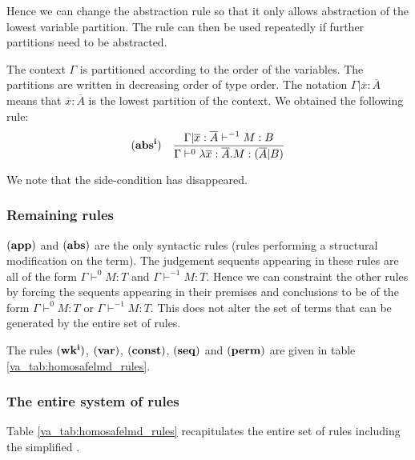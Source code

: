 Hence we can change the abstraction rule so that it only allows
abstraction of the lowest variable partition. The rule can then be
used repeatedly if further partitions need to be abstracted.

The context $\Gamma$ is partitioned according to the order of the
variables. The partitions are written in decreasing order of type
order. The notation $\Gamma | \overline{x}:\overline{A}$ means that
$\overline{x}:\overline{A}$ is the lowest partition of the context.
We obtained the following rule:
$$ \mathbf{(abs^i)} \quad  \frac{\displaystyle \Gamma| \overline{x} : \overline{A} \vdash^{-1} M : B}{\Gamma  \vdash^{0} \lambda \overline{x} : \overline{A} . M : (\overline{A}|B)}$$

We note that the side-condition has disappeared.

\subsubsection{Remaining rules}

$\mathbf{(app)}$ and $\mathbf{(abs)}$ are the only syntactic rules (rules performing a structural modification on the term).
The judgement sequents appearing in these rules are all of the form
$\Gamma \vdash^0 M : T$ and $\Gamma \vdash^{-1} M : T$. Hence we can constraint the
other rules by forcing the sequents appearing in their premises and conclusions to be of the form
$\Gamma \vdash^0 M : T$ or $\Gamma \vdash^{-1} M : T$. This does not alter the set of terms that can be generated by the entire set of rules.

The rules $\mathbf{(wk^i)}$,
$\mathbf{(var)}$, $\mathbf{(const)}$, $\mathbf{(seq)}$ and
$\mathbf{(perm)}$ are given in table \ref{va_tab:homosafelmd_rules}.


\subsubsection{The entire system of rules}

Table \ref{va_tab:homosafelmd_rules} recapitulates
the entire set of rules including the simplified .

